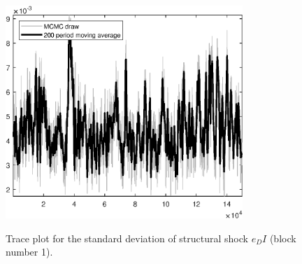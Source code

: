 \begin{figure}[H]
\centering
  \includegraphics[width=0.8\textwidth]{BRS_gen/graphs/TracePlot_SE_e_DI_blck_1}\\
    \caption{Trace plot for the standard deviation of structural shock ${e_DI}$ (block number 1).}
\end{figure}
